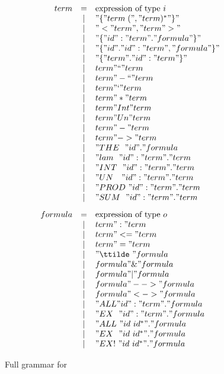 \begin{figure} 
\dquotes
\[\begin{array}{rcl}
    term & = & \hbox{expression of type~$i$} \\
	 & | & "\{ " term\; ("," term)^* " \}" \\
	 & | & "< " term ", " term " >" \\
	 & | & "\{ " id ":" term " . " formula " \}" \\
	 & | & "\{ " id " . " id ":" term "," formula " \}" \\
	 & | & "\{ " term " . " id ":" term " \}" \\
	 & | & term " `` " term \\
	 & | & term " -`` " term \\
	 & | & term " ` " term \\
	 & | & term " * " term \\
	 & | & term " Int " term \\
	 & | & term " Un " term \\
	 & | & term " - " term \\
	 & | & term " -> " term \\
	 & | & "THE~~"  id  " . " formula\\
	 & | & "lam~~"  id ":" term " . " term \\
	 & | & "INT~~"  id ":" term " . " term \\
	 & | & "UN~~~"  id ":" term " . " term \\
	 & | & "PROD~"  id ":" term " . " term \\
	 & | & "SUM~~"  id ":" term " . " term \\[2ex]
 formula & = & \hbox{expression of type~$o$} \\
	 & | & term " : " term \\
	 & | & term " <= " term \\
	 & | & term " = " term \\
	 & | & "\ttilde\ " formula \\
	 & | & formula " \& " formula \\
	 & | & formula " | " formula \\
	 & | & formula " --> " formula \\
	 & | & formula " <-> " formula \\
	 & | & "ALL " id ":" term " . " formula \\
	 & | & "EX~~" id ":" term " . " formula \\
	 & | & "ALL~" id~id^* " . " formula \\
	 & | & "EX~~" id~id^* " . " formula \\
	 & | & "EX!~" id~id^* " . " formula
  \end{array}
\]
\caption{Full grammar for {\ZF}} \label{ZF-syntax}
\end{figure} 


